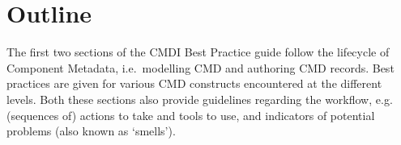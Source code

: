 \section{Outline}\label{outline}

The first two sections of the CMDI Best Practice guide follow the
lifecycle of Component Metadata, i.e.~modelling CMD and authoring CMD records. Best practices are given for various CMD constructs encountered at the different levels. Both these sections also provide guidelines regarding the workflow, e.g. (sequences of) actions to take and tools to use, and indicators of potential problems (also known as `smells').

